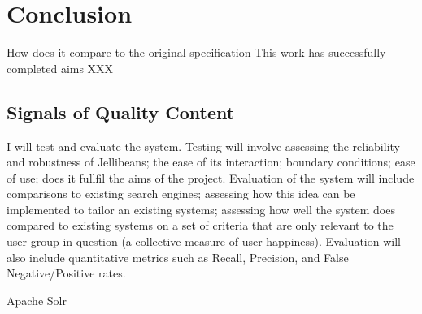 \documentclass[a4paper, 11pt]{article}
\begin{document}
\section{Conclusion}
How does it compare to the original specification
This work has successfully completed aims XXX

\subsection{Signals of Quality Content}
I will test and evaluate the system. Testing will involve assessing the reliability and robustness of Jellibeans; the ease of its interaction; boundary conditions; ease of use; does it fullfil the aims of the project.
Evaluation of the system will include comparisons to existing search engines; assessing how this idea can be implemented to tailor an existing systems; assessing how well the system does compared to existing systems on a set of criteria that are only relevant to the user group in question (a collective measure of user happiness). Evaluation will also include quantitative metrics such as Recall, Precision, and False Negative/Positive rates.


Apache Solr


	
\end{document}
